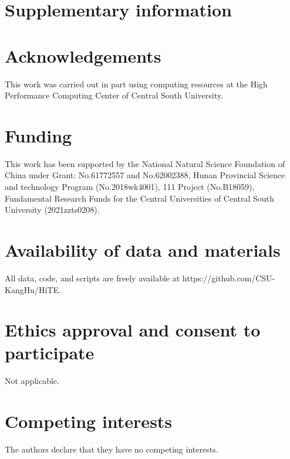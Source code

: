 \documentclass{bmcart}
\begin{document}
\section*{Supplementary information}


\begin{backmatter}

\section*{Acknowledgements}%
This work was carried out in part using computing resources at the High Performance Computing Center of Central South University.

\section*{Funding}%
This work has been supported by the National Natural Science Foundation of China under Grant: No.61772557 and No.62002388, Hunan Provincial Science and technology Program (No.2018wk4001), 111 Project (No.B18059), Fundamental Research Funds for the Central Universities of Central South University (2021zzts0208).


\section*{Availability of data and materials}%
All data, code, and scripts are freely available at https://github.com/CSU-KangHu/HiTE.

\section*{Ethics approval and consent to participate}%
Not applicable.

\section*{Competing interests}
The authors declare that they have no competing interests.


\end{backmatter}
\end{document}
